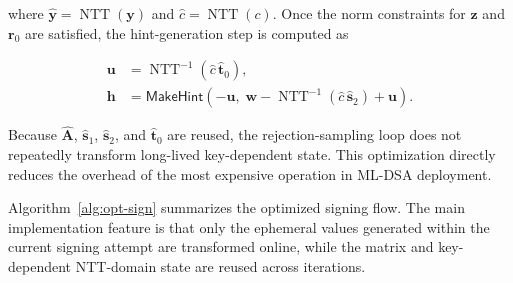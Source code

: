 \documentclass[final, twoside]{IEEEtran} %
\begin{document}
where $\hat{\mathbf{y}} = \operatorname{NTT}(\mathbf{y})$ and $\hat{c} = \operatorname{NTT}(c)$. Once the norm constraints for $\mathbf{z}$ and $\mathbf{r}_0$ are satisfied, the hint-generation step is computed as

\begin{align}
\mathbf{u} &= \operatorname{NTT}^{-1}\!\left(\hat{c}\,\hat{\mathbf{t}}_0\right), \\
\mathbf{h} &= \mathsf{MakeHint}\!\left(-\mathbf{u},\; \mathbf{w} - \operatorname{NTT}^{-1}\!\left(\hat{c}\,\hat{\mathbf{s}}_2\right) + \mathbf{u}\right).
\label{eq:hint-step}
\end{align}

Because $\hat{\mathbf{A}}$, $\hat{\mathbf{s}}_1$, $\hat{\mathbf{s}}_2$, and $\hat{\mathbf{t}}_0$ are reused, the rejection-sampling loop does not repeatedly transform long-lived key-dependent state. This optimization directly reduces the overhead of the most expensive operation in ML-DSA deployment.

Algorithm~\ref{alg:opt-sign} summarizes the optimized signing flow. The main implementation feature is that only the ephemeral values generated within the current signing attempt are transformed online, while the matrix and key-dependent NTT-domain state are reused across iterations.

\begin{algorithm}[t]
\caption{Cached-Transform ML-DSA Signing Flow}
\label{alg:opt-sign}
\small
{}
\end{algorithm}
\end{document}

